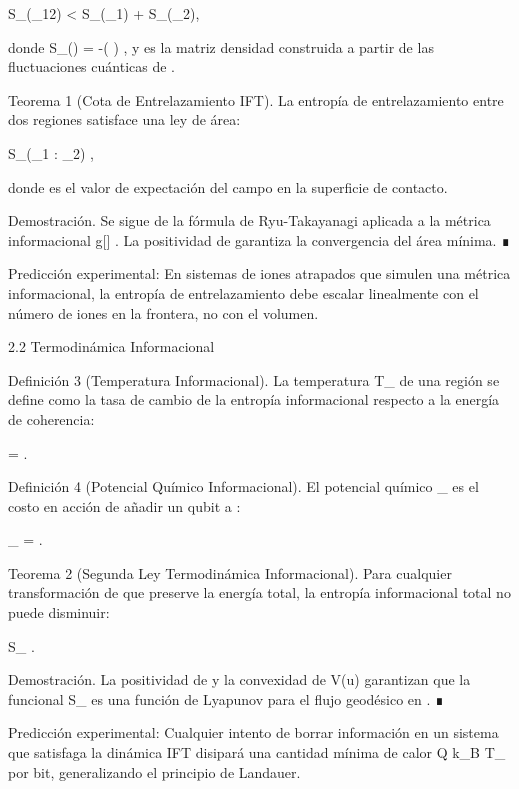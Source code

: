 \documentclass[12pt,twoside]{book}
\begin{document}
S_{}(\rho_{12}) < S_{}(\rho_1) + S_{}(\rho_2),
\]  

donde  S_{}(\rho) = -(\hat{\rho} \log \hat{\rho}) , y  \hat{\rho}  es la matriz densidad construida a partir de las fluctuaciones cuánticas de  \rho .

Teorema 1 (Cota de Entrelazamiento IFT). La entropía de entrelazamiento entre dos regiones satisface una ley de área:

S_{}(\Omega_1 : \Omega_2) \le {} \cdot \langle \rho \rangle,
\]  

donde  \langle \rho \rangle  es el valor de expectación del campo en la superficie de contacto.

Demostración. Se sigue de la fórmula de Ryu-Takayanagi aplicada a la métrica informacional  g[\rho] . La positividad de  \rho  garantiza la convergencia del área mínima. ∎

Predicción experimental: En sistemas de iones atrapados que simulen una métrica informacional, la entropía de entrelazamiento debe escalar linealmente con el número de iones en la frontera, no con el volumen.

2.2 Termodinámica Informacional

Definición 3 (Temperatura Informacional). La temperatura  T_{}  de una región  \Omega  se define como la tasa de cambio de la entropía informacional respecto a la energía de coherencia:

 = .
\]  

Definición 4 (Potencial Químico Informacional). El potencial químico  \mu_{}  es el costo en acción de añadir un qubit a  \Omega :

\mu_{} = .
\]  

Teorema 2 (Segunda Ley Termodinámica Informacional). Para cualquier transformación de  \rho  que preserve la energía total, la entropía informacional total no puede disminuir:

\Delta S_{} .
\]  

Demostración. La positividad de  \rho  y la convexidad de  V(u)  garantizan que la funcional  S_{}  es una función de Lyapunov para el flujo geodésico en   . ∎

Predicción experimental: Cualquier intento de borrar información en un sistema que satisfaga la dinámica IFT disipará una cantidad mínima de calor  Q \ge k_B T_{}   por bit, generalizando el principio de Landauer.
\end{document}
